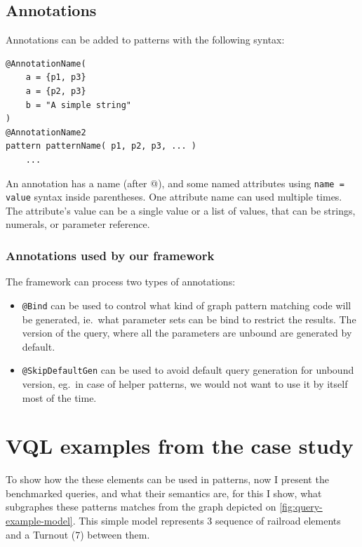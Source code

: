 \subsection{Annotations}

\begin{minipage}{\textwidth}
Annotations can be added to patterns with the following syntax:
\begin{lstlisting}[language=vql]
@AnnotationName(
	a = {p1, p3}
	a = {p2, p3}
	b = "A simple string"
)
@AnnotationName2
pattern patternName( p1, p2, p3, ... )
	...
\end{lstlisting}
\end{minipage}
\vspace{\belowdisplayskip}

An annotation has a name (after @), and some named attributes using \texttt{name = value} syntax inside parentheses.
One attribute name can used multiple times. 
The attribute's value can be a single value or a list of values, that can be strings, numerals, or parameter reference.


\subsubsection{Annotations used by our framework}

The framework can process two types of annotations:
\begin{itemize}
	\item \texttt{@Bind} can be used to control what kind of graph pattern matching code will be generated, ie.\ what parameter sets can be bind to restrict the results. The version of the query, where all the parameters are unbound are generated by default.
	
	\item \texttt{@SkipDefaultGen} can be used to avoid default query generation for unbound version, eg.\ in case of helper patterns, we would not want to use it by itself most of the time.
	
\end{itemize}


\section{VQL examples from the case study}
\label{sec:vql-examples}

To show how the these elements can be used in patterns, now I present the benchmarked queries, and what their semantics are, for this I show, what subgraphes these patterns matches from the graph depicted on \autoref{fig:query-example-model}. This simple model represents 3 sequence of railroad elements and a Turnout (7) between them.
\vspace{0.1\textwidth}


